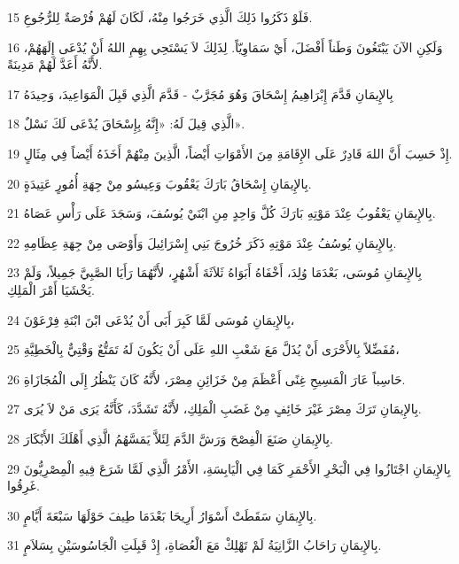\par 15 فَلَوْ ذَكَرُوا ذَلِكَ الَّذِي خَرَجُوا مِنْهُ، لَكَانَ لَهُمْ فُرْصَةٌ لِلرُّجُوعِ.
\par 16 وَلَكِنِ الآنَ يَبْتَغُونَ وَطَناً أَفْضَلَ، أَيْ سَمَاوِيّاً. لِذَلِكَ لاَ يَسْتَحِي بِهِمِ اللهُ أَنْ يُدْعَى إِلَهَهُمْ، لأَنَّهُ أَعَدَّ لَهُمْ مَدِينَةً.
\par 17 بِالإِيمَانِ قَدَّمَ إِبْرَاهِيمُ إِسْحَاقَ وَهُوَ مُجَرَّبٌ - قَدَّمَ الَّذِي قَبِلَ الْمَوَاعِيدَ، وَحِيدَهُ
\par 18 الَّذِي قِيلَ لَهُ: «إِنَّهُ بِإِسْحَاقَ يُدْعَى لَكَ نَسْلٌ».
\par 19 إِذْ حَسِبَ أَنَّ اللهَ قَادِرٌ عَلَى الإِقَامَةِ مِنَ الأَمْوَاتِ أَيْضاً، الَّذِينَ مِنْهُمْ أَخَذَهُ أَيْضاً فِي مِثَالٍ.
\par 20 بِالإِيمَانِ إِسْحَاقُ بَارَكَ يَعْقُوبَ وَعِيسُو مِنْ جِهَةِ أُمُورٍ عَتِيدَةٍ.
\par 21 بِالإِيمَانِ يَعْقُوبُ عِنْدَ مَوْتِهِ بَارَكَ كُلَّ وَاحِدٍ مِنِ ابْنَيْ يُوسُفَ، وَسَجَدَ عَلَى رَأْسِ عَصَاهُ.
\par 22 بِالإِيمَانِ يُوسُفُ عِنْدَ مَوْتِهِ ذَكَرَ خُرُوجَ بَنِي إِسْرَائِيلَ وَأَوْصَى مِنْ جِهَةِ عِظَامِهِ.
\par 23 بِالإِيمَانِ مُوسَى، بَعْدَمَا وُلِدَ، أَخْفَاهُ أَبَوَاهُ ثَلاَثَةَ أَشْهُرٍ، لأَنَّهُمَا رَأَيَا الصَّبِيَّ جَمِيلاً، وَلَمْ يَخْشَيَا أَمْرَ الْمَلِكِ.
\par 24 بِالإِيمَانِ مُوسَى لَمَّا كَبِرَ أَبَى أَنْ يُدْعَى ابْنَ ابْنَةِ فِرْعَوْنَ،
\par 25 مُفَضِّلاً بِالأَحْرَى أَنْ يُذَلَّ مَعَ شَعْبِ اللهِ عَلَى أَنْ يَكُونَ لَهُ تَمَتُّعٌ وَقْتِيٌّ بِالْخَطِيَّةِ،
\par 26 حَاسِباً عَارَ الْمَسِيحِ غِنًى أَعْظَمَ مِنْ خَزَائِنِ مِصْرَ، لأَنَّهُ كَانَ يَنْظُرُ إِلَى الْمُجَازَاةِ.
\par 27 بِالإِيمَانِ تَرَكَ مِصْرَ غَيْرَ خَائِفٍ مِنْ غَضَبِ الْمَلِكِ، لأَنَّهُ تَشَدَّدَ، كَأَنَّهُ يَرَى مَنْ لاَ يُرَى.
\par 28 بِالإِيمَانِ صَنَعَ الْفِصْحَ وَرَشَّ الدَّمَ لِئَلاَّ يَمَسَّهُمُ الَّذِي أَهْلَكَ الأَبْكَارَ.
\par 29 بِالإِيمَانِ اجْتَازُوا فِي الْبَحْرِ الأَحْمَرِ كَمَا فِي الْيَابِسَةِ، الأَمْرُ الَّذِي لَمَّا شَرَعَ فِيهِ الْمِصْرِيُّونَ غَرِقُوا.
\par 30 بِالإِيمَانِ سَقَطَتْ أَسْوَارُ أَرِيحَا بَعْدَمَا طِيفَ حَوْلَهَا سَبْعَةَ أَيَّامٍ.
\par 31 بِالإِيمَانِ رَاحَابُ الزَّانِيَةُ لَمْ تَهْلِكْ مَعَ الْعُصَاةِ، إِذْ قَبِلَتِ الْجَاسُوسَيْنِ بِسَلاَمٍ.
